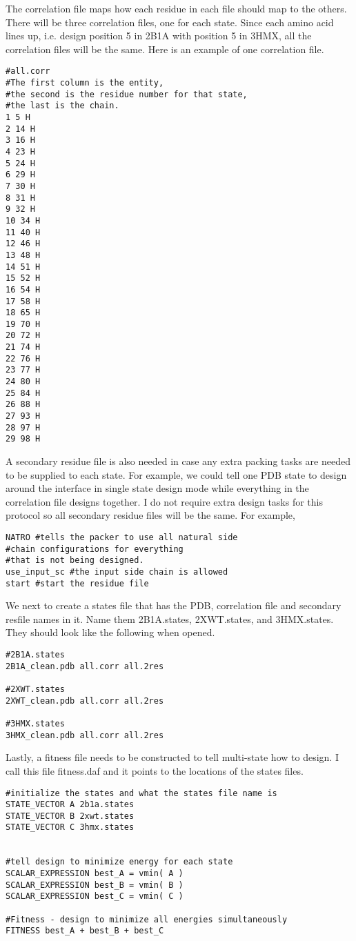 The correlation file maps how each residue in each file should map to the others. There will be three correlation files, one for each state. Since each amino acid lines up, i.e. design position 5 in 2B1A with position 5 in 3HMX, all the correlation files will be the same. Here is an example of one correlation file.

\begin{verbatim}
#all.corr
#The first column is the entity,
#the second is the residue number for that state,
#the last is the chain.
1 5 H
2 14 H
3 16 H
4 23 H
5 24 H
6 29 H
7 30 H
8 31 H
9 32 H
10 34 H
11 40 H
12 46 H
13 48 H
14 51 H
15 52 H
16 54 H
17 58 H
18 65 H
19 70 H
20 72 H
21 74 H
22 76 H
23 77 H
24 80 H
25 84 H
26 88 H
27 93 H
28 97 H
29 98 H
\end{verbatim}
A secondary residue file is also needed in case any extra packing tasks are needed to be supplied to each state. For example, we could tell one PDB state to design around the interface in single state design mode while everything in the correlation file designs together. I do not require extra design tasks for this protocol so all secondary residue files will be the same. For example,

\begin{verbatim}
NATRO #tells the packer to use all natural side
#chain configurations for everything
#that is not being designed.
use_input_sc #the input side chain is allowed
start #start the residue file
\end{verbatim}

We next to create a states file that has the PDB, correlation file and secondary resfile names in it. Name them 2B1A.states, 2XWT.states, and 3HMX.states. They should look like the following when opened.

\begin{verbatim}
#2B1A.states
2B1A_clean.pdb all.corr all.2res

#2XWT.states
2XWT_clean.pdb all.corr all.2res

#3HMX.states
3HMX_clean.pdb all.corr all.2res
\end{verbatim}

Lastly, a fitness file needs to be constructed to tell multi-state how to design. I call this file fitness.daf and it points to the locations of the states files.

\begin{verbatim}
#initialize the states and what the states file name is
STATE_VECTOR A 2b1a.states
STATE_VECTOR B 2xwt.states
STATE_VECTOR C 3hmx.states


#tell design to minimize energy for each state
SCALAR_EXPRESSION best_A = vmin( A )
SCALAR_EXPRESSION best_B = vmin( B )
SCALAR_EXPRESSION best_C = vmin( C )

#Fitness - design to minimize all energies simultaneously
FITNESS best_A + best_B + best_C
\end{verbatim}

